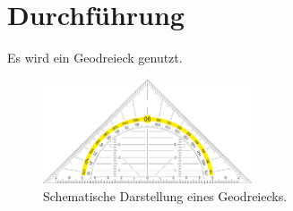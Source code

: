 \section{Durchführung}
\label{sec:durchführung}

Es wird ein Geodreieck genutzt.

\begin{figure}
	\label{fig:geodreieck}
	\centering
	\includegraphics[width=0.55\textwidth]{content/grafik/geodreieck.pdf}
	\caption{Schematische Darstellung eines Geodreiecks.}
\end{figure}

